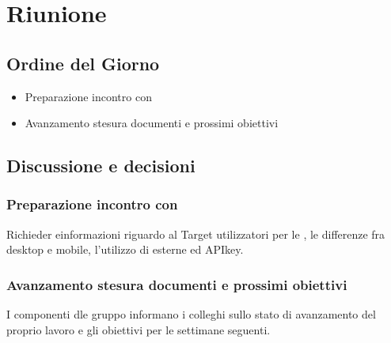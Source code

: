 \section{Riunione}
\subsection{Ordine del Giorno}
\begin{itemize}
	\item Preparazione incontro con \Proponente
	\item Avanzamento stesura documenti e prossimi obiettivi
\end{itemize}

\subsection{Discussione e decisioni}
\subsubsection{Preparazione incontro con \Proponente}
Richieder einformazioni riguardo al Target utilizzatori per le , le differenze fra  desktop e mobile, l'utilizzo di  esterne ed APIkey.

\subsubsection{Avanzamento stesura documenti e prossimi obiettivi}
I componenti dle gruppo informano i colleghi sullo stato di avanzamento del proprio lavoro e gli obiettivi per le settimane seguenti.


\clearpage
